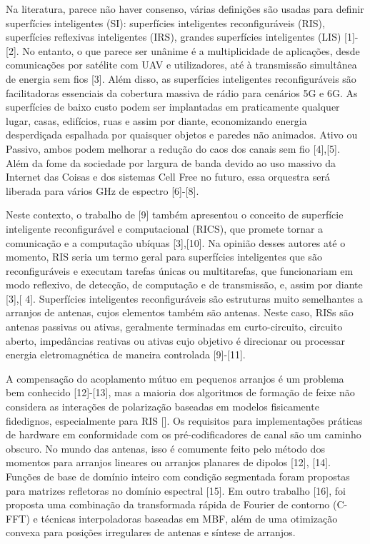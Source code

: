 \documentclass[
	12pt,				%
	openright,			%
	oneside,			%
	a4paper,			%
	english,			%
	brazil				%
	]{abntex2}
\begin{document}
Na literatura, parece não haver consenso, várias definições são usadas para definir superfícies inteligentes (SI): superfícies inteligentes reconfiguráveis ​​(RIS), superfícies reflexivas inteligentes (IRS), grandes superfícies inteligentes (LIS) [1]-[2]. No entanto, o que parece ser unânime é a multiplicidade de aplicações, desde comunicações por satélite com UAV e utilizadores, até à transmissão simultânea de energia sem fios [3]. Além disso, as superfícies inteligentes reconfiguráveis ​​são facilitadoras essenciais da cobertura massiva de rádio para cenários 5G e 6G. As superfícies de baixo custo podem ser implantadas em praticamente qualquer lugar, casas, edifícios, ruas e assim por diante, economizando energia desperdiçada espalhada por quaisquer objetos e paredes não animados. Ativo ou Passivo, ambos podem melhorar a redução do caos dos canais sem fio [4],[5]. Além da fome da sociedade por largura de banda devido ao uso massivo da Internet das Coisas e dos sistemas Cell Free no futuro, essa orquestra será liberada para vários GHz de espectro [6]-[8].

Neste contexto, o trabalho de [9] também apresentou o conceito de superfície inteligente reconfigurável e computacional (RICS), que promete tornar a comunicação e a computação ubíquas [3],[10]. Na opinião desses autores até o momento, RIS seria um termo geral para superfícies inteligentes que são reconfiguráveis ​​e executam tarefas únicas ou multitarefas, que funcionariam em modo reflexivo, de detecção, de computação e de transmissão, e, assim por diante [3],[ 4]. Superfícies inteligentes reconfiguráveis ​​são estruturas muito semelhantes a arranjos de antenas, cujos elementos também são antenas. Neste caso, RISs são antenas passivas ou ativas, geralmente terminadas em curto-circuito, circuito aberto, impedâncias reativas ou ativas cujo objetivo é direcionar ou processar energia eletromagnética de maneira controlada [9]-[11].

A compensação do acoplamento mútuo em pequenos arranjos é um problema bem conhecido [12]-[13], mas a maioria dos algoritmos de formação de feixe não considera as interações de polarização baseadas em modelos fisicamente fidedignos, especialmente para RIS []. Os requisitos para implementações práticas de hardware em conformidade com os pré-codificadores de canal são um caminho obscuro. No mundo das antenas, isso é comumente feito pelo método dos momentos para arranjos lineares ou arranjos planares de dipolos [12], [14]. Funções de base de domínio inteiro com condição segmentada foram propostas para matrizes refletoras no domínio espectral [15]. Em outro trabalho [16], foi proposta uma combinação da transformada rápida de Fourier de contorno (C-FFT) e técnicas interpoladoras baseadas em MBF, além de uma otimização convexa para posições irregulares de antenas e síntese de arranjos.
\end{document}
